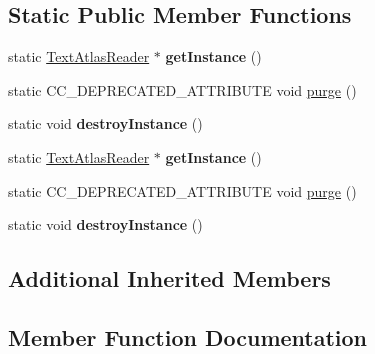 \subsection*{Static Public Member Functions}
\begin{DoxyCompactItemize}
\item 
\mbox{\label{classcocostudio_1_1TextAtlasReader_a4ff6654246b3f6f81c59c03b8d373f0f}} 
static \hyperlink{classcocostudio_1_1TextAtlasReader}{Text\+Atlas\+Reader} $\ast$ {\bfseries get\+Instance} ()
\item 
static C\+C\+\_\+\+D\+E\+P\+R\+E\+C\+A\+T\+E\+D\+\_\+\+A\+T\+T\+R\+I\+B\+U\+TE void \hyperlink{classcocostudio_1_1TextAtlasReader_a078bc1f569673be32e7c8debaf758c77}{purge} ()
\item 
\mbox{\label{classcocostudio_1_1TextAtlasReader_ac228e5bbf502764a7a2d2c2321df1bf9}} 
static void {\bfseries destroy\+Instance} ()
\item 
\mbox{\label{classcocostudio_1_1TextAtlasReader_a79f27545979ead4264c02709f97a2fb5}} 
static \hyperlink{classcocostudio_1_1TextAtlasReader}{Text\+Atlas\+Reader} $\ast$ {\bfseries get\+Instance} ()
\item 
static C\+C\+\_\+\+D\+E\+P\+R\+E\+C\+A\+T\+E\+D\+\_\+\+A\+T\+T\+R\+I\+B\+U\+TE void \hyperlink{classcocostudio_1_1TextAtlasReader_a078bc1f569673be32e7c8debaf758c77}{purge} ()
\item 
\mbox{\label{classcocostudio_1_1TextAtlasReader_a91871d38eb0c7f252873266c2eea983e}} 
static void {\bfseries destroy\+Instance} ()
\end{DoxyCompactItemize}
\subsection*{Additional Inherited Members}


\subsection{Member Function Documentation}
\mbox{\label{classcocostudio_1_1TextAtlasReader_a078bc1f569673be32e7c8debaf758c77}} 
